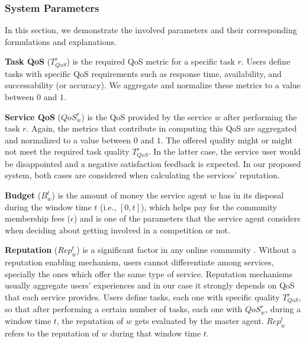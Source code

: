 

\subsubsection{System Parameters}
In this section, we demonstrate the involved parameters and their
corresponding formulations and explanations.

\textbf{Task QoS} ($T_{QoS}^r$) is the required QoS metric for a
specific task $r$. Users define tasks with specific QoS
requirements such as response time, availability, and
successability (or accuracy). We aggregate and
normalize these metrics to a value between $0$
and $1$. %

\textbf{Service QoS} ($QoS_w^r$) is the QoS provided by the
service $w$ after performing the task $r$. Again, the metrics that
contribute in computing this QoS are aggregated and normalized to
a value between $0$ and $1$. The offered quality might or might
not meet the required task quality $T_{QoS}^r$. In the latter
case, the service user would be disappointed and a negative
satisfaction feedback is expected. In our proposed system, both
cases are considered when calculating the services' reputation.


\textbf{Budget} ($B_w^t$) is the amount of money the service agent
$w$ has in its disposal during the window time $t$ (i.e.,
$[0,t]$), which helps pay for the community membership fees
($\epsilon$) and is one of the parameters that the service agent
considers when deciding about getting involved in a competition or
not.

\textbf{Reputation} ($Rep_w^t$) is a significant factor in any
online community \cite{Fouss:2010:PRM:1751668.1751727}. Without a reputation enabling
mechanism, users cannot differentiate among services, specially
the ones which offer the same type of service. Reputation
mechanisms usually aggregate users' experiences and in our case it
strongly depends on QoS that each service provides. Users define
tasks, each one with specific quality $T_{QoS}^r$, so that after
performing a certain number of tasks, each one with $QoS_w^r$,
during a window time $t$, the reputation of $w$ gets evaluated by
the master agent. $Rep_{w}^{t}$ refers to the reputation of $w$
during that window time $t$.

